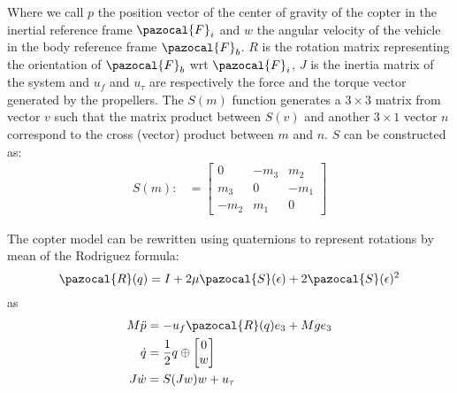 Where we call $ p $ the position vector of the center of gravity of the copter in the inertial reference frame $ \pazocal{F}_{i} $ and $ w $ the angular velocity of the vehicle in the body reference frame $ \pazocal{F}_{b} $. $ R $ is the rotation matrix representing the orientation of $ \pazocal{F}_{b} $ wrt $ \pazocal{F}_{i} $, $ J $ is the inertia matrix of the system and $ u_{f} $ and $ u_{\tau} $ are respectively the force and  the torque vector generated by the propellers.
The $S(m)$ function generates a $3\times3$ matrix from vector $v$ such that the matrix product between $S(v)$ and another $3\times1$ vector $n$ correspond to the cross (vector) product between $m$ and $n$. $S$ can be constructed as:
\begin{equation} \label{eq:coptermodelmat}
\begin{split}
S(m) :&= \begin{bmatrix}
0 & -m_{3} & m_{2}\\
m_{3} & 0 & -m_{1}\\
-m_{2} & m_{1} & 0
\end{bmatrix}
\end{split}
\end{equation}

The copter model can be rewritten using quaternions to represent rotations by mean of the Rodriguez formula\cite{bib:rodriguez}:
\[ \pazocal{R}(q) = I + 2 \mu \pazocal{S}(\epsilon) + 2 \pazocal{S}(\epsilon)^{2}
 \]
as
\begin{equation} \label{eq:coptermodelquat}
\begin{split}
M \ddot{p} &= -u_{f}\pazocal{R}(q)e_{3} + Mge_{3}\\
\dot{q} &= \frac{1}{2} q \oplus \begin{bmatrix} 0 \\ w \end{bmatrix} \\
J\dot{w} &= S (Jw) w + u_{\tau}
\end{split}
\end{equation}



